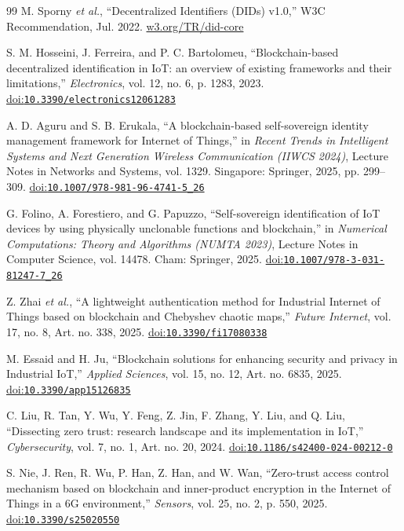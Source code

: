 \begin{thebibliography}{99}
M. Sporny \emph{et al.}, ``Decentralized Identifiers (DIDs) v1.0,'' W3C Recommendation, Jul. 2022. \href{https://www.w3.org/TR/did-core/}{w3.org/TR/did-core}

S. M. Hosseini, J. Ferreira, and P. C. Bartolomeu, ``Blockchain-based decentralized identification in IoT: an overview of existing frameworks and their limitations,'' \emph{Electronics}, vol. 12, no. 6, p. 1283, 2023. \href{https://doi.org/10.3390/electronics12061283}{doi:\nolinkurl{10.3390/electronics12061283}}

A. D. Aguru and S. B. Erukala, ``A blockchain-based self-sovereign identity management framework for Internet of Things,'' in \emph{Recent Trends in Intelligent Systems and Next Generation Wireless Communication (IIWCS 2024)}, Lecture Notes in Networks and Systems, vol. 1329. Singapore: Springer, 2025, pp. 299--309. \href{https://doi.org/10.1007/978-981-96-4741-5_26}{doi:\nolinkurl{10.1007/978-981-96-4741-5_26}}

G. Folino, A. Forestiero, and G. Papuzzo, ``Self-sovereign identification of IoT devices by using physically unclonable functions and blockchain,'' in \emph{Numerical Computations: Theory and Algorithms (NUMTA 2023)}, Lecture Notes in Computer Science, vol. 14478. Cham: Springer, 2025. \href{https://doi.org/10.1007/978-3-031-81247-7_26}{doi:\nolinkurl{10.1007/978-3-031-81247-7_26}}

Z. Zhai \emph{et al.}, ``A lightweight authentication method for Industrial Internet of Things based on blockchain and Chebyshev chaotic maps,'' \emph{Future Internet}, vol. 17, no. 8, Art. no. 338, 2025. \href{https://doi.org/10.3390/fi17080338}{doi:\nolinkurl{10.3390/fi17080338}}

M. Essaid and H. Ju, ``Blockchain solutions for enhancing security and privacy in Industrial IoT,'' \emph{Applied Sciences}, vol. 15, no. 12, Art. no. 6835, 2025. \href{https://doi.org/10.3390/app15126835}{doi:\nolinkurl{10.3390/app15126835}}

C. Liu, R. Tan, Y. Wu, Y. Feng, Z. Jin, F. Zhang, Y. Liu, and Q. Liu, ``Dissecting zero trust: research landscape and its implementation in IoT,'' \emph{Cybersecurity}, vol. 7, no. 1, Art. no. 20, 2024. \href{https://doi.org/10.1186/s42400-024-00212-0}{doi:\nolinkurl{10.1186/s42400-024-00212-0}}

S. Nie, J. Ren, R. Wu, P. Han, Z. Han, and W. Wan, ``Zero-trust access control mechanism based on blockchain and inner-product encryption in the Internet of Things in a 6G environment,'' \emph{Sensors}, vol. 25, no. 2, p. 550, 2025. \href{https://doi.org/10.3390/s25020550}{doi:\nolinkurl{10.3390/s25020550}}


\end{thebibliography}
